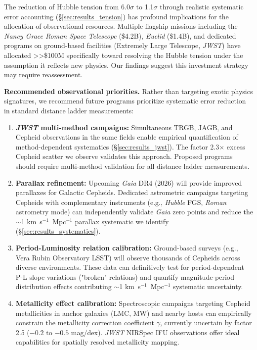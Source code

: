 \documentclass[twocolumn, linenumbers]{aastex701}
\begin{document}
The reduction of Hubble tension from 6.0$\sigma$ to 1.1$\sigma$ through realistic systematic error accounting (\S\ref{sec:results_tension}) has profound implications for the allocation of observational resources. Multiple flagship missions including the \textit{Nancy Grace Roman Space Telescope} (\$4.2B), \textit{Euclid} (\$1.4B), and dedicated programs on ground-based facilities (Extremely Large Telescope, \textit{JWST}) have allocated >>\$100M specifically toward resolving the Hubble tension under the assumption it reflects new physics. Our findings suggest this investment strategy may require reassessment.

\textbf{Recommended observational priorities.} Rather than targeting exotic physics signatures, we recommend future programs prioritize systematic error reduction in standard distance ladder measurements:

\begin{enumerate}
\item \textbf{\textit{JWST} multi-method campaigns:} Simultaneous TRGB, JAGB, and Cepheid observations in the same fields enable empirical quantification of method-dependent systematics (\S\ref{sec:results_jwst}). The factor 2.3$\times$ excess Cepheid scatter we observe validates this approach. Proposed programs should require multi-method validation for all distance ladder measurements.

\item \textbf{Parallax refinement:} Upcoming \textit{Gaia} DR4 (2026) will provide improved parallaxes for Galactic Cepheids. Dedicated astrometric campaigns targeting Cepheids with complementary instruments (e.g., \textit{Hubble} FGS, \textit{Roman} astrometry mode) can independently validate \textit{Gaia} zero points and reduce the $\sim$1 km~s$^{-1}$~Mpc$^{-1}$ parallax systematic we identify (\S\ref{sec:results_systematics}).

\item \textbf{Period-Luminosity relation calibration:} Ground-based surveys (e.g., Vera Rubin Observatory LSST) will observe thousands of Cepheids across diverse environments. These data can definitively test for period-dependent P-L slope variations ("broken" relations) and quantify magnitude-period distribution effects contributing $\sim$1 km~s$^{-1}$~Mpc$^{-1}$ systematic uncertainty.

\item \textbf{Metallicity effect calibration:} Spectroscopic campaigns targeting Cepheid metallicities in anchor galaxies (LMC, MW) and nearby hosts can empirically constrain the metallicity correction coefficient $\gamma$, currently uncertain by factor 2.5 ($-0.2$ to $-0.5$ mag/dex). \textit{JWST} NIRSpec IFU observations offer ideal capabilities for spatially resolved metallicity mapping.
\end{enumerate}
\end{document}
